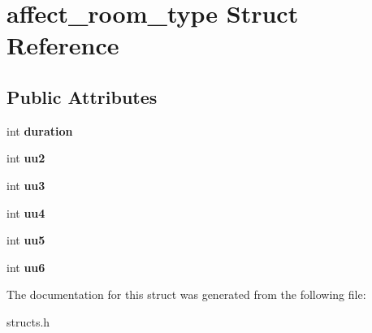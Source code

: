 \hypertarget{structaffect__room__type}{\section{affect\-\_\-room\-\_\-type Struct Reference}
\label{structaffect__room__type}
}
\subsection*{Public Attributes}
\begin{DoxyCompactItemize}
\item 
\hypertarget{structaffect__room__type_a506d872bdd8c237caefa09fd9a1d2e45}{int {\bfseries duration}}\label{structaffect__room__type_a506d872bdd8c237caefa09fd9a1d2e45}

\item 
\hypertarget{structaffect__room__type_aa433c4bcbe5cd22df04be1b4e4dd4cf1}{int {\bfseries uu2}}\label{structaffect__room__type_aa433c4bcbe5cd22df04be1b4e4dd4cf1}

\item 
\hypertarget{structaffect__room__type_ab70101c6ccdf7b115eac8c785fe474cf}{int {\bfseries uu3}}\label{structaffect__room__type_ab70101c6ccdf7b115eac8c785fe474cf}

\item 
\hypertarget{structaffect__room__type_a7fc591e6c4681f4457d36a73dde10ccb}{int {\bfseries uu4}}\label{structaffect__room__type_a7fc591e6c4681f4457d36a73dde10ccb}

\item 
\hypertarget{structaffect__room__type_a49536cc84a081f408a3633bc723c74e1}{int {\bfseries uu5}}\label{structaffect__room__type_a49536cc84a081f408a3633bc723c74e1}

\item 
\hypertarget{structaffect__room__type_acefa436b006c8fdc887e4e5961b06f12}{int {\bfseries uu6}}\label{structaffect__room__type_acefa436b006c8fdc887e4e5961b06f12}

\end{DoxyCompactItemize}


The documentation for this struct was generated from the following file\-:\begin{DoxyCompactItemize}
\item 
structs.\-h\end{DoxyCompactItemize}
